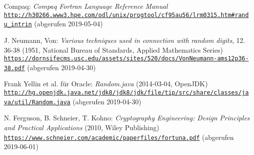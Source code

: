 \begin{thebibliography}{9}
    Compaq:
    \textit{Compaq Fortran Language Reference Manual}
    \\\texttt{\url{http://h30266.www3.hpe.com/odl/unix/progtool/cf95au56/lrm0315.htm#randu_intrin}}
    (abgerufen 2019-05-04)

    J. Neumann, Von:
    \textit{Various techniques used in connection with random digits}, 12. 36-38
    (1951, National Bureau of Standards, Applied Mathematics Series)
    \\\texttt{\url{https://dornsifecms.usc.edu/assets/sites/520/docs/VonNeumann-ams12p36-38.pdf}}
    (abgerufen 2019-04-30)

    Frank Yellin et al. f\"ur Oracle:
    \textit{Random.java} (2014-03-04, OpenJDK)
    \\\texttt{\url{http://hg.openjdk.java.net/jdk8/jdk8/jdk/file/tip/src/share/classes/java/util/Random.java}}
    (abgerufen 2019-04-30)

    N. Ferguson, B. Schneier, T. Kohno:
    \textit{Cryptography Engineering: Design Principles and Practical Applications} (2010, Wiley Publishing)
    \\\texttt{\url{https://www.schneier.com/academic/paperfiles/fortuna.pdf}}
    (abgerufen 2019-06-01)

\end{thebibliography}
